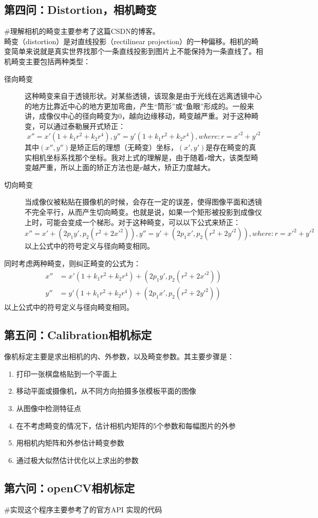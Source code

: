 \documentclass[UTF8]{ctexart}
\begin{document}
\subsection{第四问：Distortion，相机畸变}
\#理解相机的畸变主要参考了这篇CSDN的博客\cite{CSDNJessicajiel18830}。\\
畸变（distortion）是对直线投影（rectilinear projection）的一种偏移。相机的畸变简单来说就是真实世界找那个一条直线投影到图片上不能保持为一条直线了。相机畸变主要包括两种类型：
\begin{description}
  \item[径向畸变] 这种畸变来自于透镜形状。对某些透镜，该现象是由于光线在远离透镜中心的地方比靠近中心的地方更加弯曲，产生“筒形”或“鱼眼”形成的。一般来讲，成像仪中心的径向畸变为0，越向边缘移动，畸变越严重。对于这种畸变，可以通过泰勒展开式矫正：
  $$
  x''=x'(1+k_1r^2+k_2r^4),
  y''=y'(1+k_1r^2+k_2r^4),
  where:r=x'^2+y'^2
  $$
  其中$(x'',y'')$是矫正后的理想（无畸变）坐标，$(x',y')$是存在畸变的真实相机坐标系找那个坐标。我对上式的理解是，由于随着$r$增大，该类型畸变越严重，所以上面的矫正方法也是$r$越大，矫正力度越大。
  \item[切向畸变] 当成像仪被粘贴在摄像机的时候，会存在一定的误差，使得图像平面和透镜不完全平行，从而产生切向畸变。也就是说，如果一个矩形被投影到成像仪上时，可能会变成一个梯形。对于这种畸变，可以以下公式来矫正：
  $$
  x''=x'+(2p_1y',p_2(r^2+2x'^2)),
  y''=y'+(2p_1x',p_2(r^2+2y'^2)),
  where:r=x'^2+y'^2
  $$
  以上公式中的符号定义与径向畸变相同。
\end{description}
同时考虑两种畸变，则纠正畸变的公式为：
\begin{align}
  x''&=x'(1+k_1r^2+k_2r^4)+(2p_1y',p_2(r^2+2x'^2))\\
  y''&=y'(1+k_1r^2+k_2r^4)+(2p_1x',p_2(r^2+2y'^2))
\end{align}
以上公式中的符号定义与径向畸变相同。
\subsection{第五问：Calibration相机标定}
像机标定主要是求出相机的内、外参数，以及畸变参数。其主要步骤是\cite{zhang2000flexible}：
\begin{enumerate}
  \item 打印一张棋盘格贴到一个平面上
  \item 移动平面或摄像机，从不同方向拍摄多张模板平面的图像
  \item 从图像中检测特征点
  \item 在不考虑畸变的情况下，估计相机内矩阵的5个参数和每幅图片的外参
  \item 用相机内矩阵和外参估计畸变参数
  \item 通过极大似然估计优化以上求出的参数
\end{enumerate}
\subsection{第六问：openCV相机标定}
#实现这个程序主要参考了\cite{opencvCameraCalibrationl18830}的官方API
实现的代码


\end{document}
